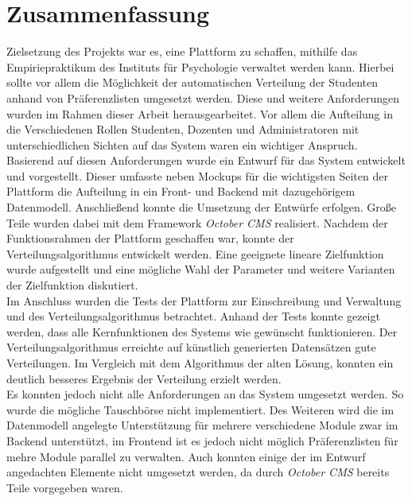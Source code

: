 \chapter{Zusammenfassung}
\label{chapter:summary}
Zielsetzung des Projekts war es, eine Plattform zu schaffen, mithilfe das Empiriepraktikum des Instituts für Psychologie verwaltet werden kann.
Hierbei sollte vor allem die Möglichkeit der automatischen Verteilung der Studenten anhand von Präferenzlisten umgesetzt werden.
Diese und weitere Anforderungen wurden im Rahmen dieser Arbeit herausgearbeitet.
Vor allem die Aufteilung in die Verschiedenen Rollen Studenten, Dozenten und Administratoren mit unterschiedlichen Sichten auf das System waren ein wichtiger Anspruch.
Basierend auf diesen Anforderungen wurde ein Entwurf für das System entwickelt und vorgestellt.
Dieser umfasste neben Mockups für die wichtigsten Seiten der Plattform die Aufteilung in ein Front- und Backend mit dazugehörigem Datenmodell.
Anschließend konnte die Umsetzung der Entwürfe erfolgen.
Große Teile wurden dabei mit dem Framework \textit{October CMS} realisiert.
Nachdem der Funktionsrahmen der Plattform geschaffen war, konnte der Verteilungsalgorithmus entwickelt werden.
Eine geeignete lineare Zielfunktion wurde aufgestellt und eine mögliche Wahl der Parameter und weitere Varianten der Zielfunktion diskutiert.\\

Im Anschluss wurden die Tests der Plattform zur Einschreibung und Verwaltung und des Verteilungsalgorithmus betrachtet.
Anhand der Tests konnte gezeigt werden, dass alle Kernfunktionen des Systems wie gewünscht funktionieren.
Der Verteilungsalgorithmus erreichte auf künstlich generierten Datensätzen gute Verteilungen.
Im Vergleich mit dem Algorithmus der alten Lösung, konnten ein deutlich besseres Ergebnis der Verteilung erzielt werden.\\

Es konnten jedoch nicht alle Anforderungen an das System umgesetzt werden.
So wurde die mögliche Tauschbörse nicht implementiert.
Des Weiteren wird die im Datenmodell angelegte Unterstützung für mehrere verschiedene Module zwar im Backend unterstützt, im Frontend ist es jedoch nicht möglich Präferenzlisten für mehre Module parallel zu verwalten.
Auch konnten einige der im Entwurf angedachten Elemente nicht umgesetzt werden, da durch \textit{October CMS} bereits Teile vorgegeben waren.




        
    
